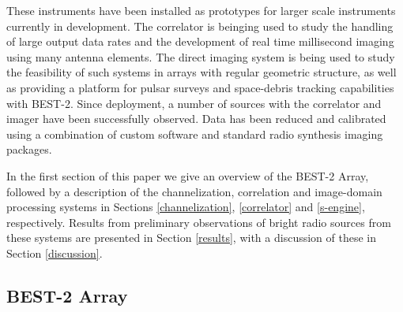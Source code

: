 \documentclass[useAMS,macros,usenatbib,onecolumn]{mn2e}
\begin{document}
These instruments have been installed as prototypes for larger scale instruments currently in development.
The correlator is beinging used to study the handling of large output data rates and the development of real time millisecond imaging using many antenna elements.
The direct imaging system is being used to study the feasibility of such systems in arrays with regular geometric structure, as well as providing a platform for pulsar surveys and space-debris tracking capabilities with BEST-2.
Since deployment, a number of sources with the correlator and imager have been successfully observed.
Data has been reduced and calibrated using a combination of custom software and standard radio synthesis imaging packages.

In the first section of this paper we give an overview of the BEST-2 Array, followed by a description of the channelization, correlation and image-domain processing systems in Sections \ref{channelization}, \ref{correlator} and \ref{s-engine}, respectively. Results from preliminary observations of bright radio sources from these systems are presented in Section \ref{results}, with a discussion of these in Section \ref{discussion}.

\subsection{BEST-2 Array}
\label{best-2 array}
\end{document}
